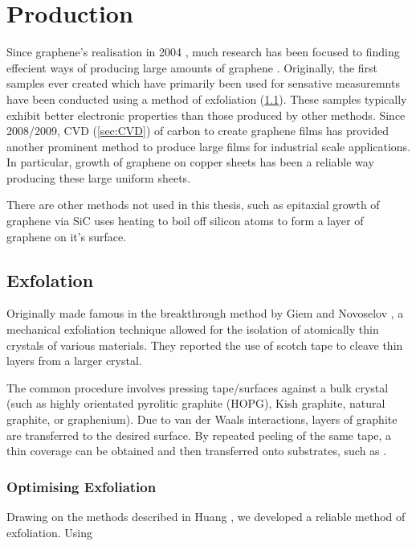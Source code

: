 \documentclass[../Matt_Gebert_Honours_Thesis.tex]{subfiles}
\begin{document}

\section{Production}
Since graphene's realisation in 2004 \cite{novoselov_electric_2004}, much research has been focused to finding effecient ways of producing large amounts of graphene \cite{zhang_review_2013}. Originally, the first samples ever created which have primarily been used for sensative measuremnts have been conducted using a method of exfoliation (\cref{sec:exfoliation}). These samples typically exhibit better electronic properties than those produced by other methods.
Since 2008/2009, CVD (\cref{sec:CVD}) of carbon to create graphene films has provided another prominent method to produce large films for industrial scale applications. In particular, growth of graphene on copper sheets \cite{li_large-area_2009} has been a reliable way producing these large uniform sheets.

There are other methods not used in this thesis, such as epitaxial growth of graphene via SiC uses heating to boil off silicon atoms to form a layer of graphene on it's surface.

\subsection{Exfolation}\label{sec:exfoliation}
Originally made famous in the breakthrough method by Giem and Novoselov \cite{novoselov_electric_2004, novoselov_two-dimensional_2005}, a mechanical exfoliation technique allowed for the isolation of atomically thin crystals of various materials. They reported the use of scotch tape to cleave thin layers from a larger crystal. 

The common procedure involves pressing tape/surfaces against a bulk crystal (such as highly orientated pyrolitic graphite (HOPG), Kish graphite, natural graphite, or graphenium). Due to van der Waals interactions, layers of graphite are transferred to the desired surface. By repeated peeling of the same tape, a thin coverage can be obtained and then transferred onto substrates, such as \silicondioxide.

\subsubsection{Optimising Exfoliation}
Drawing on the methods described in Huang \etal\cite{huang_reliable_2015}, we developed a reliable method of exfoliation. 
Using 
\end{document}
